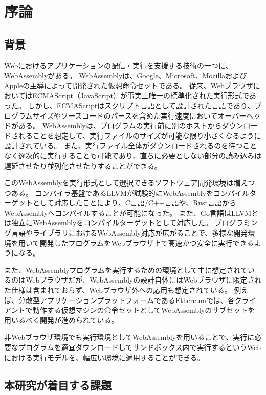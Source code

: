 \chapter{序論}
\label{chap:introduction}

\section{背景}
\label{section:background}

Webにおけるアプリケーションの配信・実行を支援する技術の一つに、WebAssemblyがある。
WebAssemblyは、Google、Microsoft、MozillaおよびAppleの主導によって開発された仮想命令セットである\cite{webassembly}。
従来、WebブラウザにおいてはECMAScript（JavaScript）が事実上唯一の標準化された実行形式であった。
しかし、ECMAScriptはスクリプト言語として設計された言語であり\cite{ecma2018}、プログラムサイズやソースコードのパースを含めた実行速度においてオーバーヘッドがある。
WebAssemblyは、プログラムの実行前に別のホストからダウンロードされることを想定して、実行ファイルのサイズが可能な限り小さくなるように設計されている。
また、実行ファイル全体がダウンロードされるのを待つことなく逐次的に実行することも可能であり、直ちに必要としない部分の読み込みは遅延させたり並列化させたりすることができる。

このWebAssemblyを実行形式として選択できるソフトウェア開発環境は増えつつある。
コンパイラ基盤であるLLVMが試験的にWebAssemblyをコンパイルターゲットとして対応した\cite{}ことにより、C言語/C++言語や、Rust言語\cite{rust_wasm}からWebAssemblyへコンパイルすることが可能になった。
また、Go言語はLLVMとは独立にWebAssemblyをコンパイルターゲットとして対応した\cite{go_wasm}。
プログラミング言語やライブラリにおけるWebAssembly対応が広がることで、多様な開発環境を用いて開発したプログラムをWebブラウザ上で高速かつ安全に実行できるようになる。

また、WebAssemblyプログラムを実行するための環境として主に想定されているのはWebブラウザだが、WebAssemblyの設計自体にはWebブラウザに限定された仕様は含まれておらず、Webブラウザ外への応用も想定されている。
例えば、分散型アプリケーションプラットフォームであるEthereum\cite{ethereum}では、各クライアントで動作する仮想マシンの命令セットとしてWebAssemblyのサブセットを用いるべく開発が進められている\cite{ewasm}。

非Webブラウザ環境でも実行環境としてWebAssemblyを用いることで、実行に必要なプログラムを適宜ダウンロードしてサンドボックス内で実行するというWebにおける実行モデルを、幅広い環境に適用することができる。

\section{本研究が着目する課題}

